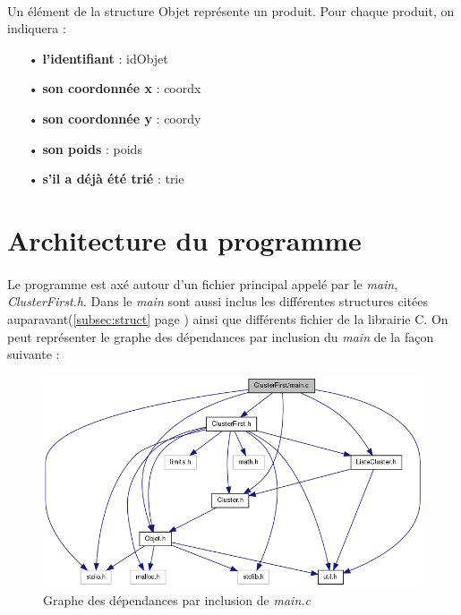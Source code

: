 \documentclass[twoside,UTF8]{EPURapport}
\begin{document}
\paragraph{}
Un élément de la structure Objet représente un produit. Pour chaque produit, on indiquera : 
\begin{itemize}
\item[•]\textbf{l'identifiant} : idObjet
\item[•]\textbf{son coordonnée x} : coordx
\item[•]\textbf{son coordonnée y} : coordy 
\item[•]\textbf{son poids} : poids
\item[•]\textbf{s'il a déjà été trié} : trie
\end{itemize}


\section{Architecture du programme}

\paragraph{}
Le programme est axé autour d'un fichier principal appelé par le \textit{main}, \textit{ClusterFirst.h}. Dans le \textit{main} sont aussi inclus les différentes structures citées auparavant(\ref{subsec:struct} page \pageref{subsec:struct}) ainsi que différents fichier de la librairie C. 
On peut représenter le graphe des dépendances par inclusion du \textit{main} de la façon suivante : 

\begin{figure}[H]
	\center
	\includegraphics[scale=0.5]{images/main_inclusion.png}
	\caption{Graphe des dépendances par inclusion de \textit{main.c}}
\end{figure} 
\end{document}
